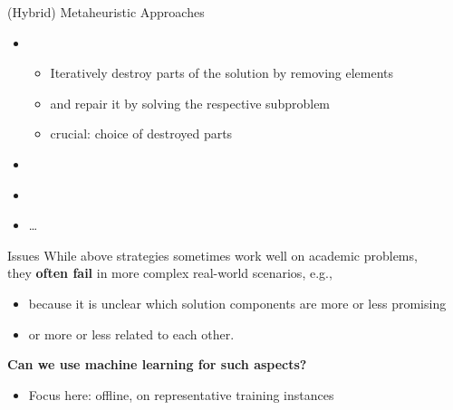 \documentclass[aspectratio=1610]{beamer}
\newcommand{\important}[1]{{\color{green!60!black}#1}}
\begin{document}
\begin{frame}{(Hybrid) Metaheuristic Approaches}
	\begin{itemize}
		\itemsep5ex
		\item {}\\
		\begin{itemize}
			\item Iteratively \important{destroy} parts of the solution by removing elements
			\item and \important{repair} it by solving the respective subproblem
			\item \alert{crucial:} choice of destroyed parts
		\end{itemize}
		\item {} \citep{blum-16b}
		\item {} \citep{taillard-02}
		\item \ldots
	\end{itemize}
\end{frame}

\begin{frame}{Issues}
	While above strategies sometimes work well on academic problems,\\ they \alert{{\bf often fail} in more complex real-world scenarios}, e.g.,
	
	\bigskip
	\begin{itemize}
		\itemsep2ex
		\item because it is \alert{unclear which solution components are more or less promising}
		\item or \alert{more or less related to each other}. 
	\end{itemize}

	\vspace{1cm}
	\important{\bf Can we use machine learning for such aspects?}
	\begin{itemize}
		\item Focus here: offline, on representative training instances
	\end{itemize}
\end{frame}

\end{document}
